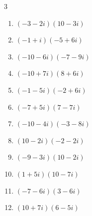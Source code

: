 \begin{multicols}{3}
\begin{enumerate}
        \phantom{$\displaystyle =10+170i$}

  \item $\displaystyle (-3-2i)(10-3i)$

        \phantom{$\displaystyle =-36-11i$}

  \item $\displaystyle (-1+i)(-5+6i)$

        \phantom{$\displaystyle =-1-11i$}

  \item $\displaystyle (-10-6i)(-7-9i)$

        \phantom{$\displaystyle =16+132i$}

  \item $\displaystyle (-10+7i)(8+6i)$

        \phantom{$\displaystyle =-122-4i$}

  \item $\displaystyle (-1-5i)(-2+6i)$

        \phantom{$\displaystyle =32+4i$}

  \item $\displaystyle (-7+5i)(7-7i)$

        \phantom{$\displaystyle =-14+84i$}

  \item $\displaystyle (-10-4i)(-3-8i)$

        \phantom{$\displaystyle =-2+92i$}

  \item $\displaystyle (10-2i)(-2-2i)$

        \phantom{$\displaystyle =-24-16i$}

  \item $\displaystyle (-9-3i)(10-2i)$

        \phantom{$\displaystyle =-96-12i$}

\columnbreak %

\resetques

  \item $\displaystyle (1+5i)(10-7i)$

        \phantom{$\displaystyle =45+43i$}

  \item $\displaystyle (-7-6i)(3-6i)$

        \phantom{$\displaystyle =-57+24i$}

  \item $\displaystyle (10+7i)(6-5i)$

        \phantom{$\displaystyle =95-8i$}


\end{enumerate}
\end{multicols}
